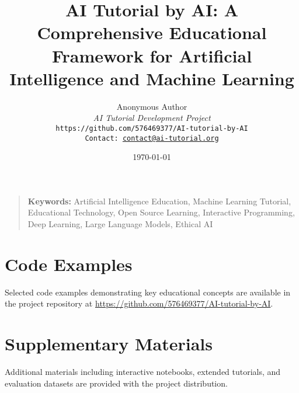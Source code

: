 \documentclass[11pt,twocolumn]{article}
\title{AI Tutorial by AI: A Comprehensive Educational Framework for Artificial Intelligence and Machine Learning}
\author{
    Anonymous Author\\
    \textit{AI Tutorial Development Project}\\
    \texttt{https://github.com/576469377/AI-tutorial-by-AI}\\
    \texttt{Contact: \href{mailto:contact@ai-tutorial.org}{contact@ai-tutorial.org}}
}
\date{\today}
\begin{document}
\maketitle



\begin{quote}
\textbf{Keywords:} Artificial Intelligence Education, Machine Learning Tutorial, Educational Technology, Open Source Learning, Interactive Programming, Deep Learning, Large Language Models, Ethical AI
\end{quote}











\appendix
\section{Code Examples}
\label{appendix:code}

Selected code examples demonstrating key educational concepts are available in the project repository at \url{https://github.com/576469377/AI-tutorial-by-AI}.

\section{Supplementary Materials}
\label{appendix:materials}

Additional materials including interactive notebooks, extended tutorials, and evaluation datasets are provided with the project distribution.
\end{document}
